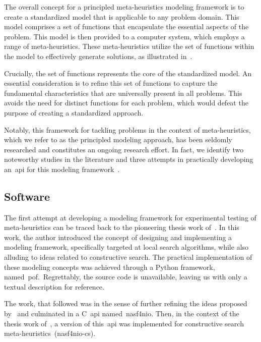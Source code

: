 The overall concept for a principled meta-heuristics modeling framework is to
create a standardized model that is applicable to any problem domain. This model
comprises a set of functions that encapsulate the essential aspects of the
problem. This model is then provided to a computer system, which employs a range
of meta-heuristics. These meta-heuristics utilize the set of functions within
the model to effectively generate solutions, as illustrated in~.

Crucially, the set of functions represents the core of the standardized model.
An essential consideration is to refine this set of functions to capture the
fundamental characteristics that are universally present in all problems. This
avoids the need for distinct functions for each problem, which would defeat the
purpose of creating a standardized approach.

Notably, this framework for tackling problems in the context of meta-heuristics,
which we refer to as the principled modeling approach, has been seldomly
researched and constitutes an ongoing research effort. In fact, we identify two
noteworthy studies in the literature and three attempts in practically
developing an~\acrfull{api} for this modeling
framework~\cite{vieira2009uma,outeiro2021application,fonseca2021nasf4nio}.

\subsection{Software}

The first attempt at developing a modeling framework for experimental testing of
meta-heuristics can be traced back to the pioneering thesis work
of~\citet{vieira2009uma}. In this work, the author introduced the concept of
designing and implementing a modeling framework, specifically targeted at local
search algorithms, while also alluding to ideas related to constructive search.
The practical implementation of these modeling concepts was achieved through a
Python framework, named~\acrfull{pof}.~Regrettably, the source code is
unavailable, leaving us with only a textual description for reference.

The work, that followed was in the sense of further refining the ideas proposed
by~\citet{vieira2009uma} and culminated in a C~\acrshort{api}
named~\acrfull{nasf4nio}. Then, in the context of the thesis work
of~\citet{outeiro2021application}, a version of this~\acrshort{api} was
implemented for constructive search meta-heuristics~(\acrshort{nasf4nio-cs}).

